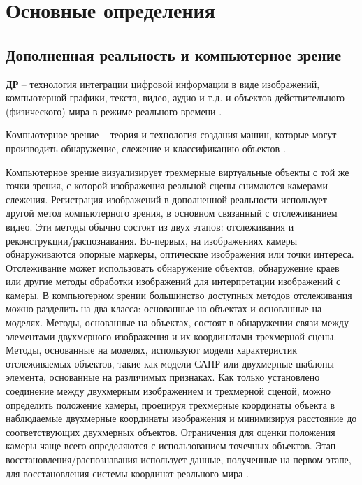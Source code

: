 \section{Основные определения}

\subsection{Дополненная реальность и компьютерное зрение}

\textbf{ДР} -- технология интеграции цифровой информации в виде изображений, компьютерной графики, текста, видео, аудио и т.д. и объектов действительного (физического) мира в режиме реального времени \cite{tech-ar}.

Компьютерное зрение -- теория и технология создания машин, которые могут производить обнаружение, слежение и классификацию объектов \cite{comp_vision}. 

Компьютерное зрение визуализирует трехмерные виртуальные объекты с той же точки зрения, с которой изображения реальной сцены снимаются камерами слежения. Регистрация изображений в дополненной реальности использует другой метод компьютерного зрения, в основном связанный с отслеживанием видео. Эти методы обычно состоят из двух этапов: отслеживания и реконструкции/распознавания. Во-первых, на изображениях камеры обнаруживаются опорные маркеры, оптические изображения или точки интереса. Отслеживание может использовать обнаружение объектов, обнаружение краев или другие методы обработки изображений для интерпретации изображений с камеры. В компьютерном зрении большинство доступных методов отслеживания можно разделить на два класса: основанные на объектах и основанные на моделях. Методы, основанные на объектах, состоят в обнаружении связи между элементами двухмерного изображения и их координатами трехмерной сцены. Методы, основанные на моделях, используют модели характеристик отслеживаемых объектов, такие как модели САПР \cite{cad} или двухмерные шаблоны элемента, основанные на различимых признаках. Как только установлено соединение между двухмерным изображением и трехмерной сценой, можно определить положение камеры, проецируя трехмерные координаты объекта в наблюдаемые двухмерные координаты изображения и минимизируя расстояние до соответствующих двухмерных объектов. Ограничения для оценки положения камеры чаще всего определяются с использованием точечных объектов. Этап восстановления/распознавания использует данные, полученные на первом этапе, для восстановления системы координат реального мира \cite{ar_overview}.

